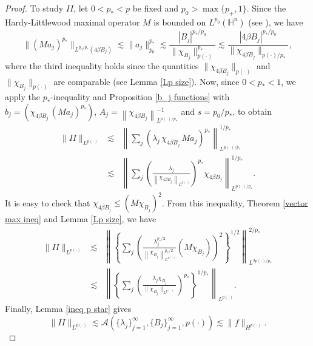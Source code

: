 \documentclass[oneside,10pt]{article}
\begin{document}
\begin{proof}
\qquad

To study $II$, let $0 < p_{*} < \underline{p}$ be fixed and $p_{0} > \max \{ p_{+}, 1 \}$. Since the Hardy-Littlewood maximal operator $M$ is bounded on $L^{p_0}(\mathbb{H}^n)$ (see \cite[Theorem 1, p. 13]{Elias}), we have
\[
\|  (Ma_j)^{p_{*}} \|_{L^{p_{0}/p_{*}}(4 \beta B_j)} \lesssim \| a_j \|_{p_0}^{p_{*}} \lesssim 
\frac{ |B_j |^{p_{*}/p_0}}{\| \chi_{B_j} \|_{p(\cdot)}^{p_{*}}} 
\lesssim \frac{ |4\beta B_j |^{p_{*}/p_0}}{\| \chi_{4\beta B_j} \|_{p(\cdot)/p_{*}}},
\]
where the third inequality holds since the quantities $\| \chi_{4\beta B_j} \|_{p(\cdot)}$ and $\| \chi_{B_j} \|_{p(\cdot)}$ are 
comparable (see Lemma \ref{Lp size}). Now, since $0 < p_{*} < 1$, we apply the $p_{\ast}$-inequality and Proposition 
\ref{b_j functions} with $b_j = \left( \chi_{4\beta B_{j}} \, (Ma_j)^{p_{*}} \right)$, $A_j = \left\| \chi_{4\beta B_{j}} \right\|_{L^{p(\cdot)/p_{*}}}^{-1}$ and $s= p_0/p_{*}$, to obtain
\begin{eqnarray*}
\| II \|_{L^{p(\cdot)}} &\lesssim& \left\| \sum_{j} \left(\lambda_j \, \chi_{4\beta B_{j}} \, Ma_j \right)^{p_{*}} 
\right\|^{1/p_{*}}_{L^{p(\cdot)/p_{*}}} \\
&\lesssim& \left\| \sum_{j} \left( \frac{\lambda_j}{\left\| \chi_{4\beta B_{j}} \right\|_{L^{p(\cdot)}}} \right)^{p_{*}} 
\chi_{4\beta B_{j}} \right\|^{1/p_{*}}_{L^{p(\cdot)/p_{*}}}.
\end{eqnarray*}
It is easy to check that $\chi_{4\beta B_{j}} \leq (M\chi_{B_j})^{2}$. From this inequality, Theorem \ref{vector max ineq} and Lemma \ref{Lp size}, we have
\begin{eqnarray*}
\| II \|_{L^{p(\cdot)}} &\lesssim& \left\| \left\{ \sum_{j} \left( \frac{\lambda_j^{p_{*}/2}}{\left\| \chi_{B_{j}} 
\right\|^{p_{*}/2}_{L^{p(\cdot)}}} (M\chi_{B_j}) \right)^{2}  \right\}^{1/2} \right\|^{2/p_{*}}_{L^{2p(\cdot)/p_{*}}} \\
&\lesssim& \left\| \left\{ \sum_{j} \left( \frac{ \lambda_j \chi_{B_j}}{\| \chi_{B_j} \|_{L^{p(\cdot)}}} \right)^{p_{*}} 
\right\}^{1/p_{*}} \right\|_{L^{p(\cdot)}}.
\end{eqnarray*}
Finally, Lemma \ref{ineq p star} gives
\[
\| II \|_{L^{p(\cdot)}} \lesssim \mathcal{A}\left( \{ \lambda_j \}_{j=1}^{\infty}, \{ B_j \}_{j=1}^{\infty}, p(\cdot) \right) 
\lesssim \| f \|_{H^{p(\cdot)}}.
\]


\end{proof}
\end{document}
